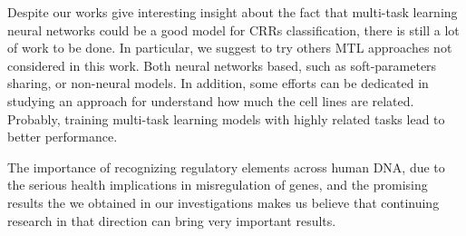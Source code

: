 Despite our works give interesting insight about the fact that multi-task learning neural networks could be a good model for CRRs classification, there is still a lot of work to be done. In particular, we suggest to try others MTL approaches not considered in this work. Both neural networks based, such as soft-parameters sharing, or non-neural models. In addition, some efforts can be dedicated in studying an approach for understand how much the cell lines are related. Probably, training multi-task learning models with highly related tasks lead to better performance.

The importance of recognizing regulatory elements across human DNA, due to the serious health implications in misregulation of genes, and the promising results the we obtained in our investigations makes us believe that continuing research in that direction can bring very important results. 
